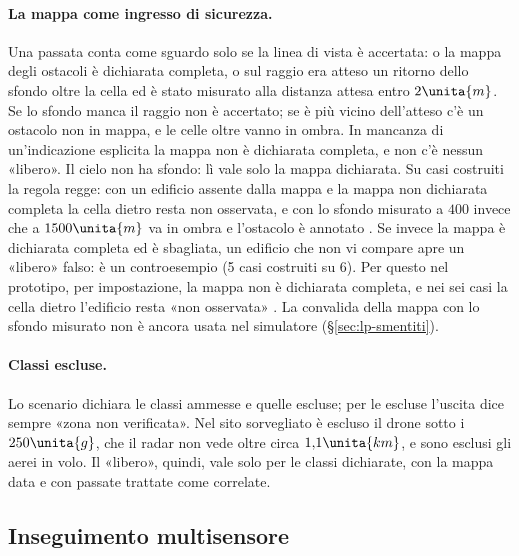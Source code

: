\paragraph{La mappa come ingresso di sicurezza.} Una passata conta come sguardo solo se la linea di vista è accertata: o la mappa degli ostacoli è dichiarata completa, o sul raggio era atteso un ritorno dello sfondo oltre la cella ed è stato misurato alla distanza attesa entro $2\unita{m}$. Se lo sfondo manca il raggio non è accertato; se è più vicino dell'atteso c'è un ostacolo non in mappa, e le celle oltre vanno in ombra. In mancanza di un'indicazione esplicita la mappa non è dichiarata completa, e non c'è nessun «libero». Il cielo non ha sfondo: lì vale solo la mappa dichiarata. Su casi costruiti la regola regge: con un edificio assente dalla mappa e la mappa non dichiarata completa la cella dietro resta non osservata, e con lo sfondo misurato a $400$ invece che a $1500\unita{m}$ va in ombra e l'ostacolo è annotato . Se invece la mappa è dichiarata completa ed è sbagliata, un edificio che non vi compare apre un «libero» falso: è un controesempio (5 casi costruiti su 6). Per questo nel prototipo, per impostazione, la mappa non è dichiarata completa, e nei sei casi la cella dietro l'edificio resta «non osservata» . La convalida della mappa con lo sfondo misurato non è ancora usata nel simulatore (\S\ref{sec:lp-smentiti}).

\paragraph{Classi escluse.} Lo scenario dichiara le classi ammesse e quelle escluse; per le escluse l'uscita dice sempre «zona non verificata». Nel sito sorvegliato è escluso il drone sotto i $250\unita{g}$, che il radar non vede oltre circa $1{,}1\unita{km}$, e sono esclusi gli aerei in volo. Il «libero», quindi, vale solo per le classi dichiarate, con la mappa data e con passate trattate come correlate.

\subsection{Inseguimento multisensore}\label{sec:lp-inseguimento}

